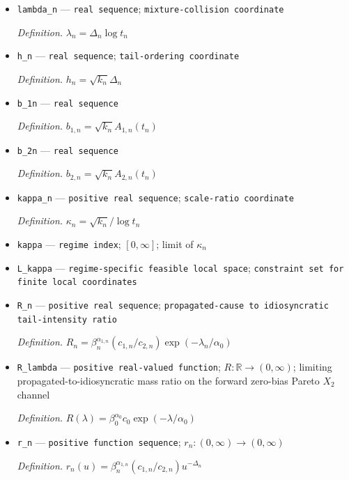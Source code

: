\documentclass{article}
\begin{document}
\begin{itemize}
  \item \texttt{lambda\_\allowbreak{}n} --- \texttt{real sequence}; \texttt{mixture-\allowbreak{}collision coordinate}
  \par\smallskip\noindent\emph{Definition.} \(\lambda_n=\Delta_n\log t_n\)
  \item \texttt{h\_\allowbreak{}n} --- \texttt{real sequence}; \texttt{tail-\allowbreak{}ordering coordinate}
  \par\smallskip\noindent\emph{Definition.} \(h_n=\sqrt{k_n}\Delta_n\)
  \item \texttt{b\_\allowbreak{}1n} --- \texttt{real sequence}
  \par\smallskip\noindent\emph{Definition.} \(b_{1,n}=\sqrt{k_n}A_{1,n}(t_n)\)
  \item \texttt{b\_\allowbreak{}2n} --- \texttt{real sequence}
  \par\smallskip\noindent\emph{Definition.} \(b_{2,n}=\sqrt{k_n}A_{2,n}(t_n)\)
  \item \texttt{kappa\_\allowbreak{}n} --- \texttt{positive real sequence}; \texttt{scale-\allowbreak{}ratio coordinate}
  \par\smallskip\noindent\emph{Definition.} \(\kappa_n=\sqrt{k_n}/\log t_n\)
  \item \texttt{kappa} --- \texttt{regime index}; \([0,\infty]\); limit of \(\kappa_n\)
  \item \texttt{L\_\allowbreak{}kappa} --- \texttt{regime-\allowbreak{}specific feasible local space}; \texttt{constraint set for finite local coordinates}
  \item \texttt{R\_\allowbreak{}n} --- \texttt{positive real sequence}; \texttt{propagated-\allowbreak{}cause to idiosyncratic tail-\allowbreak{}intensity ratio}
  \par\smallskip\noindent\emph{Definition.} \(R_n=\beta_n^{\alpha_{1,n}}(c_{1,n}/c_{2,n})\exp(-\lambda_n/\alpha_0)\)
  \item \texttt{R\_\allowbreak{}lambda} --- \texttt{positive real-\allowbreak{}valued function}; \(R:\mathbb R\to(0,\infty)\); limiting propagated-to-idiosyncratic mass ratio on the forward zero-bias Pareto \(X_2\) channel
  \par\smallskip\noindent\emph{Definition.} \(R(\lambda)=\beta_0^{\alpha_0}c_0\exp(-\lambda/\alpha_0)\)
  \item \texttt{r\_\allowbreak{}n} --- \texttt{positive function sequence}; \(r_n:(0,\infty)\to(0,\infty)\)
  \par\smallskip\noindent\emph{Definition.} \(r_n(u)=\beta_n^{\alpha_{1,n}}(c_{1,n}/c_{2,n})u^{-\Delta_n}\)

\end{itemize}
\end{document}
